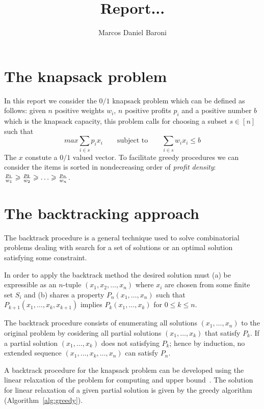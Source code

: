 \documentclass{article}
\title{Report...}
\author{Marcos Daniel Baroni}
\begin{document}

\section{The knapsack problem}

In this report we consider the $0/1$ knapsack problem which can be defined as follows:
given $n$ positive weights $w_i$, $n$ positive profits $p_i$ and a positive
number $b$ which is the knapsack capacity, this problem calls for choosing a
subset $s \in [n]$ such that
\begin{displaymath}
  max \sum_{i \in s} p_i x_i \qquad \text{subject to} \qquad
  \sum_{i \in s} w_i x_i \leqslant b
\end{displaymath}
The $x$ constute a $0/1$ valued vector.
To facilitate greedy procedures we can consider the items is sorted in
nondecreasing order of {\it profit density}:
  ${p_1 \over w_1} \geqslant {p_2 \over w_2} \geqslant \ldots \geqslant {p_n \over w_n}$.


\section{The backtracking approach}
The backtrack procedure is a general technique used to solve combinatorial
problems dealing with search for a set of solutions or an optimal
solution satisfying some constraint.

In order to apply the backtrack method the desired solution must (a) be
expressible as an $n$-tuple $(x_1, x_2, \ldots, x_n)$ where $x_i$ are chosen
from some finite set $S_i$ and (b) shares a property $P_n(x_1, \ldots, x_n)$
such that $P_{k+1}(x_1, \ldots, x_k, x_{k+1})$ implies $P_{k}(x_1, \ldots, x_k)$
for $0 \leqslant k \leqslant n$.

The backtrack procedure consists of enumerating all solutions $(x_1, \ldots, x_n)$
to the original problem by cosidering all partial solutions $(x_1, \ldots, x_k)$
that satisfy $P_k$.
If a partial solution $(x_1, \ldots, x_k)$ does not satisfying $P_k$; hence by induction,
no extended sequence $(x_1, \ldots, x_k, \ldots, x_n)$ can satisfy $P_n$.

A backtrack procedure for the knapsack problem can be developed using the linear
relaxation of the problem for computing and upper bound~\cite{horowitz1978fundamentals}.
The solution for linear relaxation of a given partial solution is given by
the greedy algorithm (Algorithm~\ref{alg:greedy}).
\end{document}
